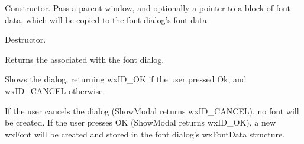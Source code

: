 
Constructor. Pass a parent window, and optionally a pointer to a block of font
data, which will be copied to the font dialog's font data.



Destructor.



Returns the  associated with the font dialog.



Shows the dialog, returning wxID\_OK if the user pressed Ok, and wxID\_CANCEL
otherwise.

If the user cancels the dialog (ShowModal returns wxID\_CANCEL), no font will be
created. If the user presses OK (ShowModal returns wxID\_OK), a new wxFont will
be created and stored in the font dialog's wxFontData structure.

